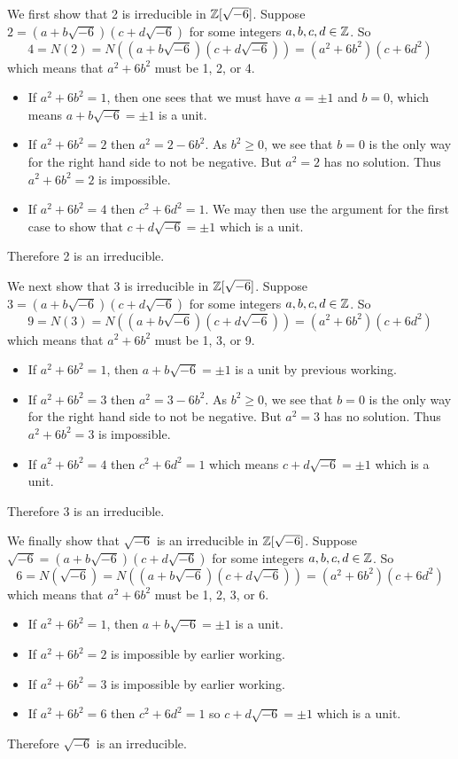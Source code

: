 \begin{questions}
    We first show that 2 is irreducible in $\mathbb{Z}[\sqrt{-6}]$. Suppose $2 = (a+b\sqrt{-6})(c+d\sqrt{-6})$ for some integers $a,b,c,d\in \mathbb{Z}$. So
    \[
        4 = N(2) = N((a+b\sqrt{-6})(c+d\sqrt{-6})) = (a^2+6b^2)(c+6d^2)
    \]
    which means that $a^2+6b^2$ must be 1, 2, or 4.
    \begin{itemize}
        \item If $a^2+6b^2 = 1$, then one sees that we must have $a = \pm1$ and $b = 0$, which means $a+b\sqrt{-6} = \pm1$ is a unit.
        \item If $a^2+6b^2 = 2$ then $a^2 = 2 - 6b^2$. As $b^2 \geq 0$, we see that $b = 0$ is the only way for the right hand side to not be negative. But $a^2 = 2$ has no solution. Thus $a^2+6b^2 = 2$ is impossible.
        \item If $a^2+6b^2 = 4$ then $c^2+6d^2 = 1$. We may then use the argument for the first case to show that $c+d\sqrt{-6} = \pm1$ which is a unit.
    \end{itemize}
    Therefore 2 is an irreducible.

    We next show that 3 is irreducible in $\mathbb{Z}[\sqrt{-6}]$. Suppose $3 = (a+b\sqrt{-6})(c+d\sqrt{-6})$ for some integers $a,b,c,d\in \mathbb{Z}$. So
    \[
        9 = N(3) = N((a+b\sqrt{-6})(c+d\sqrt{-6})) = (a^2+6b^2)(c+6d^2)
    \]
    which means that $a^2+6b^2$ must be 1, 3, or 9.
    \begin{itemize}
        \item If $a^2+6b^2 = 1$, then $a+b\sqrt{-6} = \pm1$ is a unit by previous working.
        \item If $a^2+6b^2 = 3$ then $a^2 = 3 - 6b^2$. As $b^2 \geq 0$, we see that $b = 0$ is the only way for the right hand side to not be negative. But $a^2 = 3$ has no solution. Thus $a^2+6b^2 = 3$ is impossible.
        \item If $a^2+6b^2 = 4$ then $c^2+6d^2 = 1$ which means $c+d\sqrt{-6} = \pm1$ which is a unit.
    \end{itemize}
    Therefore 3 is an irreducible.

    We finally show that $\sqrt{-6}$ is an irreducible in $\mathbb{Z}[\sqrt{-6}]$. Suppose $\sqrt{-6} = (a+b\sqrt{-6})(c+d\sqrt{-6})$ for some integers $a,b,c,d\in \mathbb{Z}$. So
    \[
        6 = N(\sqrt{-6}) = N((a+b\sqrt{-6})(c+d\sqrt{-6})) = (a^2+6b^2)(c+6d^2)
    \]
    which means that $a^2+6b^2$ must be 1, 2, 3, or 6.
    \begin{itemize}
        \item If $a^2+6b^2 = 1$, then $a+b\sqrt{-6} = \pm1$ is a unit.
        \item If $a^2+6b^2 = 2$ is impossible by earlier working.
        \item If $a^2+6b^2 = 3$ is impossible by earlier working.
        \item If $a^2+6b^2 = 6$ then $c^2+6d^2 = 1$ so $c+d\sqrt{-6} = \pm1$ which is a unit.
    \end{itemize}
    Therefore $\sqrt{-6}$ is an irreducible.


\end{questions}
